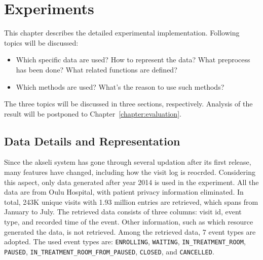 \chapter{Experiments}
\label{chapter:Experiment}


	
This chapter describes the detailed experimental implementation. Following topics will be discussed:
\begin{itemize}
	\item	Which specific data are used? How to represent the data? What preprocess has been done? What related functions are defined?
	\item	Which methods are used? What's the reason to use such methods? 
\end{itemize}
The three topics will be discussed in three sections, respectively. Analysis of the result will be postponed to Chapter~\ref{chapter:evaluation}.

\section{Data Details and Representation}
Since the akseli system has gone through several updation after its first release, many features have changed, including how the visit log is reocrded. Considering this aspect, only data generated after year 2014 is used in the experiment. All the data are from Oulu Hospital, with patient privacy information eliminated. In total, 243K unique visits with 1.93 million entries are retrieved, which spans from January to July. The retrieved data consists of three columns: visit id, event type, and recorded time of the event. Other information, such as which resource generated the data, is not retrieved. Among the retrieved data, 7 event types are adopted. The used event types are: \texttt{ENROLLING}, \texttt{WAITING}, \texttt{IN\_TREATMENT\_ROOM}, \texttt{PAUSED}, \texttt{IN\_TREATMENT\_ROOM\_FROM\_PAUSED}, \texttt{CLOSED}, and \texttt{CANCELLED}.

